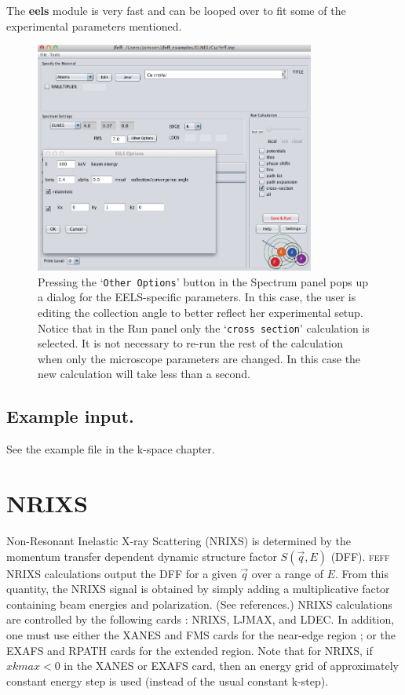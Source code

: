 \documentclass[11pt,oneside]{report} %
\renewcommand{\htmlref}[2]{\hyperlink{#2}{#1}}
\newcommand{\program}[1]{\textsc{#1}}
\newcommand{\feff}{\program{feff}}
\newcommand{\file}[1]{`\texttt{#1}'}
\newcommand{\module}[1]{\textrm{\bf{#1}}}
\renewcommand{\htmlref}[2]{{#1}} %
\begin{document}
 The \module{eels} module is very fast and can be looped over to fit some of the experimental parameters mentioned.

\begin{figure}[H]
	\centering
		\includegraphics[height=3.0in]{eels1.png}
		\caption{Pressing the \file{Other Options} button in the Spectrum panel pops up a dialog for the EELS-specific parameters.  In this case, the user is editing the collection angle to better reflect her experimental setup.  Notice that in the Run panel only the \file{cross section} calculation is selected.  It is not necessary to re-run the rest of the calculation when only the microscope parameters are changed.  In this case the new calculation will take less than a second.}
	\label{fig:eels1}
\end{figure}


\subsection{Example input.}
See the \htmlref{example file} {sec:k-space} in the k-space chapter.



\section{NRIXS}
\label{sec:nrixs}

Non-Resonant Inelastic X-ray Scattering (NRIXS) is determined by the momentum transfer dependent
dynamic structure factor $S(\vec{q},E)$ (DFF).  {\feff} NRIXS calculations output the DFF for a given $\vec{q}$ over a range of $E$.
From this quantity, the NRIXS signal is obtained by simply adding a multiplicative factor containing beam energies and polarization.  (See references.)
NRIXS calculations are controlled by the following cards :  NRIXS, LJMAX, and LDEC.  In addition, one must use either the XANES 
and FMS cards for the near-edge region ; or the EXAFS and RPATH cards for the extended region.
Note that for NRIXS, if $xkmax < 0$ in the XANES or EXAFS card, then an energy grid of approximately constant energy
step is used (instead of the usual constant k-step).
\end{document}
